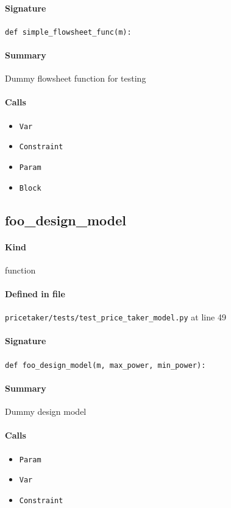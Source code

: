 \documentclass[11pt]{report}
\begin{document}
\paragraph{Signature} \texttt{def simple\_flowsheet\_func(m):}
\paragraph{Summary} Dummy flowsheet function for testing
\paragraph{Calls}
\begin{itemize}[leftmargin=*]
  \item \texttt{Var}
  \item \texttt{Constraint}
  \item \texttt{Param}
  \item \texttt{Block}
\end{itemize}
\subsection{foo\_design\_model}
\label{def:pricetaker-tests-test_price_taker_model.py:foo_design_model:L49}
\paragraph{Kind} function
\paragraph{Defined in file} \texttt{pricetaker/tests/test\_price\_taker\_model.py} at line 49
\paragraph{Signature} \texttt{def foo\_design\_model(m, max\_power, min\_power):}
\paragraph{Summary} Dummy design model
\paragraph{Calls}
\begin{itemize}[leftmargin=*]
  \item \texttt{Param}
  \item \texttt{Var}
  \item \texttt{Constraint}
\end{itemize}
\end{document}
